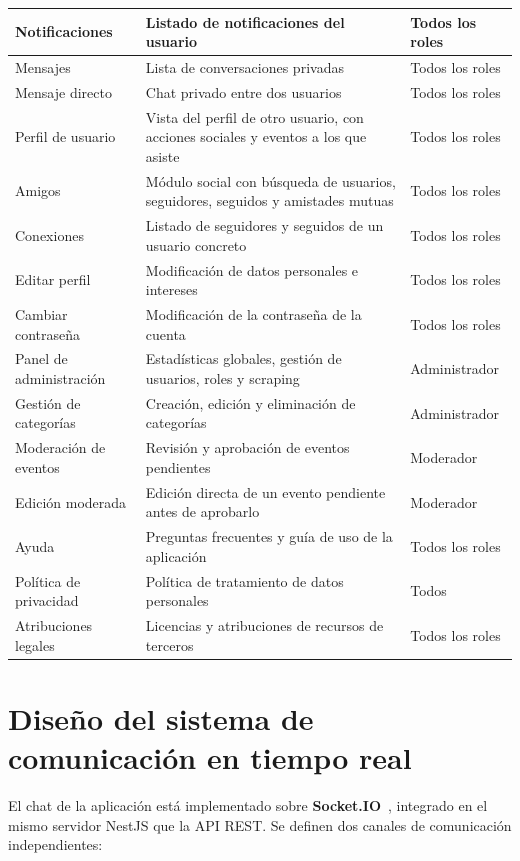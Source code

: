 {\begin{longtable}{|
>{\raggedright\arraybackslash}p{}|
>{\raggedright\arraybackslash}p{}|
>{\raggedright\arraybackslash}p{}|}
\hline
Notificaciones & Listado de notificaciones del usuario & Todos los roles \\
\hline
Mensajes & Lista de conversaciones privadas & Todos los roles \\
\hline
Mensaje directo & Chat privado entre dos usuarios & Todos los roles \\
\hline
Perfil de usuario & Vista del perfil de otro usuario, con acciones sociales y eventos a los que asiste & Todos los roles \\
\hline
Amigos & Módulo social con búsqueda de usuarios, seguidores, seguidos y amistades mutuas & Todos los roles \\
\hline
Conexiones & Listado de seguidores y seguidos de un usuario concreto & Todos los roles \\
\hline
Editar perfil & Modificación de datos personales e intereses & Todos los roles \\
\hline
Cambiar contraseña & Modificación de la contraseña de la cuenta & Todos los roles \\
\hline
Panel de administración & Estadísticas globales, gestión de usuarios, roles y scraping & Administrador \\
\hline
Gestión de categorías & Creación, edición y eliminación de categorías & Administrador \\
\hline
Moderación de eventos & Revisión y aprobación de eventos pendientes & Moderador \\
\hline
Edición moderada & Edición directa de un evento pendiente antes de aprobarlo & Moderador \\
\hline
Ayuda & Preguntas frecuentes y guía de uso de la aplicación & Todos los roles \\
\hline
Política de privacidad & Política de tratamiento de datos personales & Todos \\
\hline
Atribuciones legales & Licencias y atribuciones de recursos de terceros & Todos los roles \\
\hline
\end{longtable}}


\section{Diseño del sistema de comunicación en tiempo real}

El chat de la aplicación está implementado sobre \textbf{Socket.IO}~\cite{socketio}, integrado en el mismo servidor NestJS que la API REST. Se definen dos canales de comunicación independientes:

